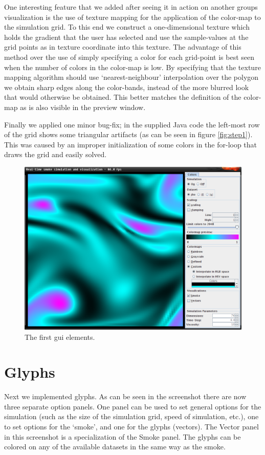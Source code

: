 \documentclass[a4paper,11pt,twoside]{report}
\begin{document}
		One interesting feature that we added after seeing it in action on another groups visualization is the use of texture mapping for the application of the color-map to the simulation grid. To this end we construct a one-dimensional texture which holds the gradient that the user has selected and use the sample-values at the grid points as in texture coordinate into this texture. The advantage of this method over the use of simply specifying a color for each grid-point is best seen when the number of colors in the color-map is low. By specifying that the texture mapping algorithm should use `nearest-neighbour' interpolation over the polygon we obtain sharp edges along the color-bands, instead of the more blurred look that would otherwise be obtained. This better matches the definition of the color-map as is also visible in the preview window.

		Finally we applied one minor bug-fix; in the supplied Java code the left-most row of the grid shows some triangular artifacts (as can be seen in figure \ref{fig:step1}). This was caused by an improper initialization of some colors in the for-loop that draws the grid and easily solved.
		\begin{figure}[h]
		\centering
		\includegraphics[scale=\imagescalefactor]{images/step2.png}
		\caption{The first gui elements.}\label{fig:step2}
		\end{figure}
		\clearpage
	\section{Glyphs}
		Next we implemented glyphs. As can be seen in the screenshot there are now three separate option panels. One panel can be used to set general options for the simulation (such as the size of the simulation grid, speed of simulation, etc.), one to set options for the `smoke', and one for the glyphs (vectors). The Vector panel in this screenshot is a specialization of the Smoke panel. The glyphs can be colored on any of the available datasets in the same way as the smoke.
\end{document}
